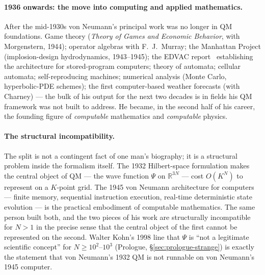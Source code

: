 \paragraph{1936 onwards: the move into computing and applied mathematics.}
After the mid-1930s von Neumann's principal work was no longer in QM foundations. Game theory (\emph{Theory of Games and Economic Behavior}, with Morgenstern, 1944); operator algebras with F.~J.~Murray; the Manhattan Project (implosion-design hydrodynamics, 1943--1945); the EDVAC report~\cite{vonNeumann1945} establishing the architecture for stored-program computers; theory of automata; cellular automata; self-reproducing machines; numerical analysis (Monte Carlo, hyperbolic-PDE schemes); the first computer-based weather forecasts (with Charney) --- the bulk of his output for the next two decades is in fields his QM framework was not built to address. He became, in the second half of his career, the founding figure of \emph{computable} mathematics and \emph{computable} physics.

\paragraph{The structural incompatibility.}
The split is not a contingent fact of one man's biography; it is a structural problem inside the formalism itself. The 1932 Hilbert-space formulation makes the central object of QM --- the wave function $\Psi$ on $\mathbb{R}^{3N}$ --- cost $O(K^N)$ to represent on a $K$-point grid. The 1945 von Neumann architecture for computers --- finite memory, sequential instruction execution, real-time deterministic state evolution --- is the practical embodiment of computable mathematics. The same person built both, and the two pieces of his work are structurally incompatible for $N>1$ in the precise sense that the central object of the first cannot be represented on the second. Walter Kohn's 1998 line that $\Psi$ is ``not a legitimate scientific concept'' for $N \geq 10^2$--$10^3$ (Prologue, \S\ref{sec:prologue-strange}) is exactly the statement that von Neumann's 1932 QM is not runnable on von Neumann's 1945 computer.

